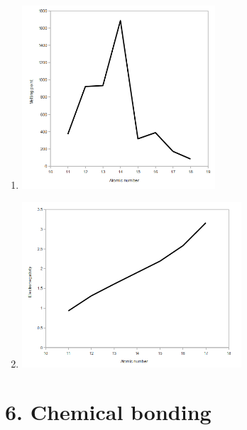 \begin{multicols}{3}
\begin{enumerate}[itemsep=6pt, label=\textbf{\arabic*}. ]
\begin{enumerate}[noitemsep, label=\textbf{(\alph*)} ]
    \item \includegraphics[width=.2\textwidth]{photos/periodictable_eocex_graph3.png}
    \item \includegraphics[width=.2\textwidth]{photos/periodic_table_eocex_graph4.png}
    \end{enumerate}
\end{enumerate}
\end{multicols}

\section {6. Chemical bonding}
